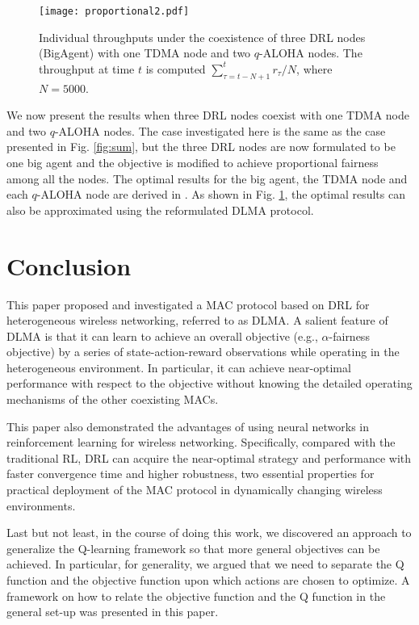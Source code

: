 \documentclass[journal,comsoc]{IEEEtran}
\begin{document}
\begin{figure}[!t]
	\centering
	\texttt{[image: proportional2.pdf]}
	\caption{Individual throughputs under the coexistence of three DRL nodes (BigAgent) with one TDMA node and two $  q $-ALOHA nodes. The throughput at time $ t $ is computed  $\sum\nolimits_{\tau  = t - N + 1}^t {{r_\tau }/N} $, where    $ N=5000 $. }
	\label{fig:proportional}
	\vspace{0in}
\end{figure}
We now present the results when three DRL nodes coexist with one TDMA node and two  $ q $-ALOHA nodes. The case investigated here is the same as the case presented in Fig. \ref{fig:sum}, but the three DRL nodes are now formulated to be one big agent and the objective is modified to achieve proportional fairness among all the nodes. The optimal results for the big agent, the TDMA node and each $ q $-ALOHA node are derived in \cite{benchmark}. As shown in Fig. \ref{fig:proportional}, the optimal results can also be approximated using the reformulated DLMA protocol. 

\section{Conclusion}
This paper proposed and investigated a MAC protocol based on DRL for heterogeneous wireless networking, referred to as DLMA. A salient feature of DLMA is that it can learn to achieve an overall objective (e.g., $ \alpha $-fairness objective) by a series of state-action-reward observations while operating in the heterogeneous environment. In particular, it can achieve near-optimal performance with respect to the objective without knowing the detailed operating mechanisms of the other coexisting MACs. 

This paper also demonstrated the advantages of using neural networks in reinforcement learning for wireless networking. Specifically, compared with the traditional RL, DRL can acquire the near-optimal strategy and performance with faster convergence time and higher robustness, two essential properties for practical deployment of the MAC protocol in dynamically changing wireless environments. 

Last but not least, in the course of doing this work, we discovered an approach to generalize the Q-learning framework so that more general objectives can be achieved. In particular, for generality, we argued that we need to separate the Q function and the objective function upon which actions are chosen to optimize. A framework on how to relate the objective function and the Q function in the general set-up was presented in this paper. 
\end{document}
